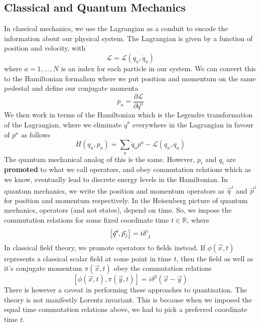 \documentclass[11pt, oneside]{article}   	%
\theoremstyle{slanted}
\begin{document}
\begin{itemize}
\subsection{Classical and Quantum Mechanics}
In classical mechanics, we use the Lagrangian 
as a conduit to encode the information about our 
physical system. The Lagrangian is given by a function 
of position and velocity, with 
\[
	\mathcal{ L }  = \mathcal{ L } \left( q _ a , \dot {q} _ a  \right) 
\] where $ a = 1 , \dots  , N $ is an index for each particle 
in our system. We can convert this to the Hamiltonian formalism 
where we put position and momentum on the same pedestal and 
define our conjugate momenta
\[
 p _ a = \frac{\partial  \mathcal{ L }}{\partial  \dot{q } ^ a  } 
\] We then work in terms of the Hamiltonian 
which is the Legendre transformation of the 
Lagrangian, where we eliminate $ \dot{ q }^ a   $
everywhere in the Lagrangian in favour of $ p^ a$ as follows 
\[
	H ( q_a , p _ a  ) = \sum _{ a } \dot{ q }_ a p ^ a  - \mathcal{ L } \left( q _ a , \dot{ q } _ a  \right)   
\] 
The quantum mechanical analog of this is the same. 
However, $ p_ i $ and $ q _ i $ are \textbf{promoted} to 
what we call operators, and obey commutation relations 
which as we know, eventually lead to discrete energy levels 
in the Hamiltonian. In quantum mechanics,
we write the position and momentum operators 
as $ \vec{q}^ i  $ and $ \vec{p} ^ i $ for position  
and momentum respectively. 
In the Heisenberg picture of quantum mechanics, 
operators (and not states), depend on time. 
So, we impose the commutation relations 
for some fixed coordinate time $ t \in \mathbb{ R } $, where 
\[
 \left[  \vec{q}^ i , \vec{p} _ j  \right]   = i  \delta \indices{ ^ i _ j }  
\]  
In classical field theory, we 
promote operators 
to fields instead. If $ \phi ( \vec{x} , t ) $  
represents a classical scalar field at some point in time $ t $, 
then the field as well as it's conjugate momentum $ \pi \left( \vec{x}, t   \right) $ 
obey the commutation relations
\[
	\left[  \phi ( \vec{x},  t ) , \pi ( \vec{y}, t  )  \right]  
	= i \delta ^ 3 \left( \vec{x} - \vec{y} \right) 
\] There is however a caveat in performing these 
approaches to quantisation. 
The theory is not manifestly Lorentz invariant. This is because 
when we imposed the equal time commutation 
relations above, we had to pick a preferred coordinate 
time $ t $. 


\end{itemize}
\end{document}
